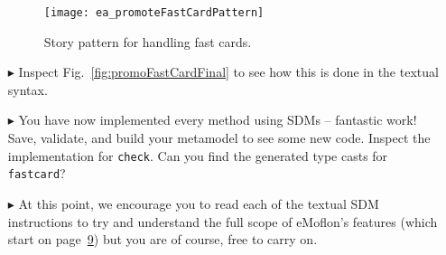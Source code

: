 \begin{itemize}
\begin{figure}[htbp]
\begin{center}
  \texttt{[image: ea\_promoteFastCardPattern]}
  \caption{Story pattern for handling fast cards.}  
  \label{fig:promoteFastCardPattern}
\end{center}
\end{figure}

\item[$\blacktriangleright$] Inspect Fig.~\ref{fig:promoFastCardFinal} to see how this is done in the textual syntax.

\item[$\blacktriangleright$] You have now implemented every method using SDMs -- fantastic work! Save, validate, and build your metamodel to see some new code.
Inspect the implementation for \texttt{check}.  Can you find the generated type casts for \texttt{fastcard}?

\item[$\blacktriangleright$] At this point, we encourage you to read each of the textual SDM instructions to try and understand the full scope of eMoflon's
features (which start on page~\hyperlink{page.9}{9}) but you are of course, free to carry on.


\end{itemize}
